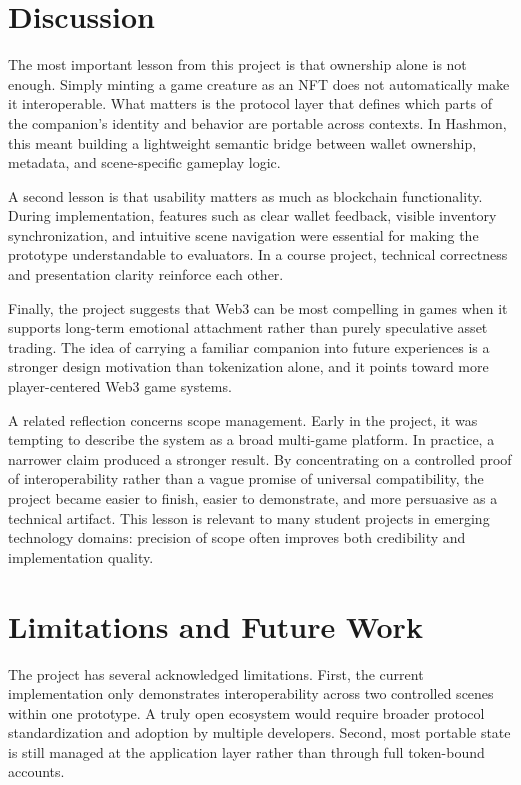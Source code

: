\documentclass[sigconf]{acmart}
\begin{document}
\section{Discussion}
The most important lesson from this project is that ownership alone is not enough. Simply minting a game creature as an NFT does not automatically make it interoperable. What matters is the protocol layer that defines which parts of the companion's identity and behavior are portable across contexts. In Hashmon, this meant building a lightweight semantic bridge between wallet ownership, metadata, and scene-specific gameplay logic.

A second lesson is that usability matters as much as blockchain functionality. During implementation, features such as clear wallet feedback, visible inventory synchronization, and intuitive scene navigation were essential for making the prototype understandable to evaluators. In a course project, technical correctness and presentation clarity reinforce each other.

Finally, the project suggests that Web3 can be most compelling in games when it supports long-term emotional attachment rather than purely speculative asset trading. The idea of carrying a familiar companion into future experiences is a stronger design motivation than tokenization alone, and it points toward more player-centered Web3 game systems.

A related reflection concerns scope management. Early in the project, it was tempting to describe the system as a broad multi-game platform. In practice, a narrower claim produced a stronger result. By concentrating on a controlled proof of interoperability rather than a vague promise of universal compatibility, the project became easier to finish, easier to demonstrate, and more persuasive as a technical artifact. This lesson is relevant to many student projects in emerging technology domains: precision of scope often improves both credibility and implementation quality.

\section{Limitations and Future Work}
The project has several acknowledged limitations. First, the current implementation only demonstrates interoperability across two controlled scenes within one prototype. A truly open ecosystem would require broader protocol standardization and adoption by multiple developers. Second, most portable state is still managed at the application layer rather than through full token-bound accounts.
\end{document}
